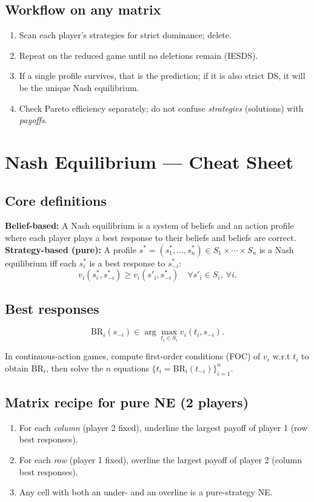 \documentclass[10pt]{article}
\newcommand{\br}{\mathrm{BR}}
\begin{document}
\subsection*{Workflow on any matrix}
\begin{enumerate}[label=\arabic*)]
\item Scan each player’s strategies for strict dominance; delete.
\item Repeat on the reduced game until no deletions remain (IESDS).
\item If a single profile survives, that is the prediction; if it is also strict DS, it will be the unique Nash equilibrium.
\item Check Pareto efficiency separately; do not confuse \emph{strategies} (solutions) with \emph{payoffs}.
\end{enumerate}



\section*{Nash Equilibrium — Cheat Sheet}

\subsection*{Core definitions}
\textbf{Belief-based:} A Nash equilibrium is a system of beliefs and an action profile where each player plays a best response to their beliefs and beliefs are correct. \\
\textbf{Strategy-based (pure):} A profile $s^*=(s_1^*,\dots,s_n^*)\in S_1\times\cdots\times S_n$ is a Nash equilibrium iff each $s_i^*$ is a best response to $s_{-i}^*$:
\[
v_i(s_i^*,s_{-i}^*) \ge v_i(s'_i,s_{-i}^*) \quad \forall s'_i\in S_i,\ \forall i.
\]

\subsection*{Best responses}
\[
\br_i(s_{-i}) \in \arg\max_{t_i\in S_i} v_i(t_i,s_{-i}).
\]

In continuous-action games, compute first-order conditions (FOC) of $v_i$ w.r.t $t_i$ to obtain $\br_i$, then solve the $n$ equations $\{t_i=\br_i(t_{-i})\}_{i=1}^n$.

\subsection*{Matrix recipe for pure NE (2 players)}
\begin{enumerate}[label=\arabic*)]
\item For each \emph{column} (player 2 fixed), underline the largest payoff of player 1 (row best responses).
\item For each \emph{row} (player 1 fixed), overline the largest payoff of player 2 (column best responses).
\item Any cell with both an under- and an overline is a pure-strategy NE.
\end{enumerate}
\end{document}
